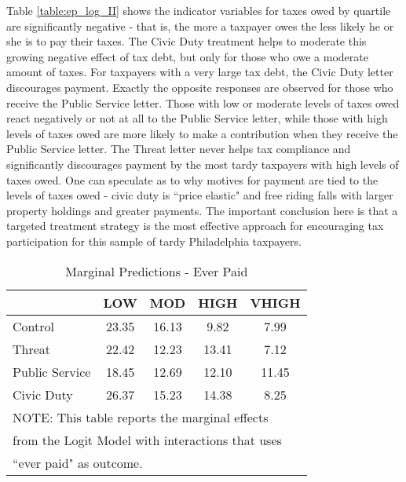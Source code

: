 \documentclass[12pt,titlepage]{article}
\begin{document}
Table \ref{table:ep_log_II} shows the indicator variables for taxes owed by
quartile are significantly negative - that is, the more a taxpayer
owes the less likely he or she is to pay their taxes.  The Civic Duty
treatment helps to moderate this growing negative effect of tax debt,
but only for those who owe a moderate amount of taxes.  For taxpayers
with a very large tax debt, the Civic Duty letter discourages payment.
Exactly the opposite responses are observed for those who receive the
Public Service letter.  Those with low or moderate levels of taxes
owed react negatively or not at all to the Public Service letter,
while those with high levels of taxes owed are more likely to make a
contribution when they receive the Public Service letter.  The Threat
letter never helps tax compliance and significantly discourages payment
by the most tardy taxpayers with high levels of taxes owed.  One can
speculate as to why motives for payment are tied to the levels of
taxes owed - civic duty is ``price elastic" and free riding falls with
larger property holdings and greater payments. The important
conclusion here is that a targeted treatment strategy is the most
effective approach for encouraging tax participation for this sample
of tardy Philadelphia taxpayers.


\begin{table}[htbp]
\caption{Marginal Predictions - Ever Paid} 
\label{table:modelI_marg}
\centering
\begin{tabular}{|l|c|c|c|c|}
  \hline
 & LOW & MOD & HIGH & VHIGH \\ 
  \hline
Control & 23.35 & 16.13 & 9.82 & 7.99 \\ 
  Threat & 22.42 & 12.23 & 13.41 & 7.12 \\ 
  Public Service & 18.45 & 12.69 & 12.10 & 11.45 \\ 
  Civic Duty & 26.37 & 15.23 & 14.38 & 8.25 \\ 
   \hline
\multicolumn{5}{l}{NOTE: This table reports the marginal effects} \\
\multicolumn{5}{l}{from the Logit Model with interactions that uses} \\
\multicolumn{5}{l}{``ever paid" as outcome.} \\
\end{tabular}
\end{table}
\end{document}
